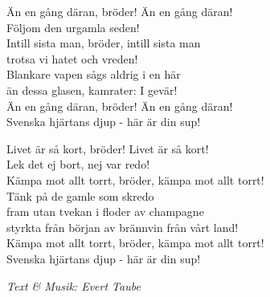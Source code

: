 \vspace{10pt}
Än en gång däran, bröder! Än en gång däran!\\
Följom den urgamla seden!\\
Intill sista man, bröder, intill sista man\\
trotsa vi hatet och vreden!\\
Blankare vapen sågs aldrig i en här\\
än dessa glasen, kamrater: I gevär!\\
Än en gång däran, bröder! Än en gång däran!\\
Svenska hjärtans djup - här är din sup!\par
\vspace{10pt}
Livet är så kort, bröder! Livet är så kort!\\
Lek det ej bort, nej var redo!\\
Kämpa mot allt torrt, bröder, kämpa mot allt torrt!\\
Tänk på de gamle som skredo\\
fram utan tvekan i floder av champagne\\
styrkta från början av brännvin från vårt land!\\
Kämpa mot allt torrt, bröder, kämpa mot allt torrt!\\
Svenska hjärtans djup - här är din sup!\par
\vspace{10pt}
{\footnotesize\textit{Text \& Musik: Evert Taube}}
